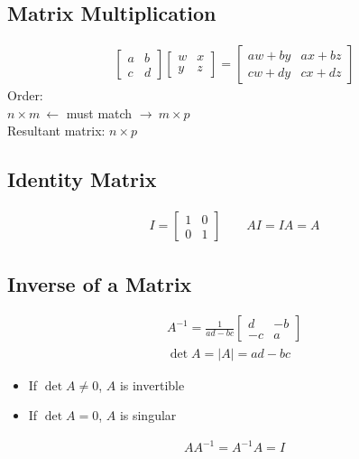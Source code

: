 \documentclass[10pt, a4paper, titlepage]{article}
\begin{document}
\begin{multicols*}{3}
\subsection{Matrix Multiplication}
\begin{align}
	\begin{bmatrix}
		a & b\\
		c & d
	\end{bmatrix}
	\begin{bmatrix}
		w & x\\
		y & z
	\end{bmatrix}
	=
	\begin{bmatrix}
		aw+by & ax+bz\\
		cw+dy & cx+dz
	\end{bmatrix}
\end{align}
Order:\\
$n\times m\ \leftarrow$ must match $\rightarrow \ m\times p$\\
Resultant matrix: $n\times p$\\

\dotfill
\subsection{Identity Matrix}
\begin{align}
	I=
	\begin{bmatrix}
		1 & 0\\
		0 & 1
	\end{bmatrix}
	\qquad AI=IA=A
\end{align}

\dotfill
\subsection{Inverse of a Matrix}
\begin{gather}
	A^{-1}=\frac{1}{ad-bc}
	\begin{bmatrix}
		d & -b\\
		-c & a
	\end{bmatrix}\\
	\det{A}=|A|=ad-bc
\end{gather}
\begin{itemize}
	\item If $\det{A}\neq 0$, $A$ is invertible
	\item If $\det{A}=0$, $A$ is singular
\end{itemize}
\begin{align}
	AA^{-1}=A^{-1}A=I
\end{align}
\dotfill

\end{multicols*}
\end{document}
